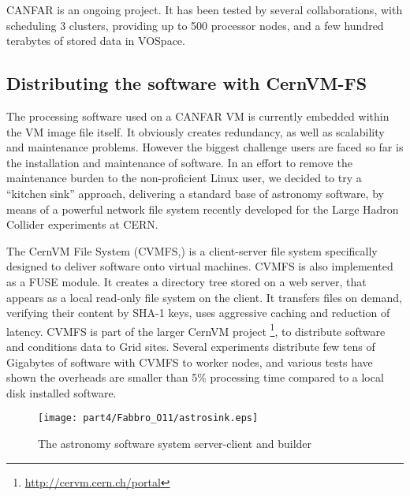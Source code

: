 \indent CANFAR is an ongoing project. It has been tested by several
collaborations, with scheduling 3 clusters, providing up to 500
processor nodes, and a few hundred terabytes of stored data in
VOSpace.

\subsection{Distributing the software with CernVM-FS}
The processing software used on a CANFAR VM is currently embedded within the VM image
file itself. It obviously creates redundancy, as
well as scalability and maintenance problems. However the
biggest challenge users are faced so far is the installation and
maintenance of software. In an effort to remove the maintenance burden
to the non-proficient Linux user, we decided to try a ``kitchen sink''
approach, delivering a standard base of astronomy software, by means
of a powerful network file system recently developed for the Large
Hadron Collider experiments at CERN.

\indent The CernVM File System (CVMFS,\cite{blomer11}) is a client-server file system
specifically designed to deliver software onto virtual machines. CVMFS
is also implemented as a FUSE module. It creates a directory
tree stored on a web server, that appears as a local read-only file
system on the client. It transfers files on demand, verifying their
content by SHA-1 keys,  uses aggressive caching and reduction of latency. CVMFS is
part of the larger CernVM project \footnote{\url{http://cervm.cern.ch/portal}}, to distribute software and
conditions data to Grid sites. Several experiments distribute few tens of Gigabytes of software with CVMFS to worker
nodes, and various tests have shown the overheads are smaller than 5\%
processing time compared to a local disk installed software.

\begin{center}
  \begin{figure}
    \texttt{[image: part4/Fabbro\_O11/astrosink.eps]}
    \caption{The astronomy software system server-client and builder}
  \end{figure}  
\end{center}

